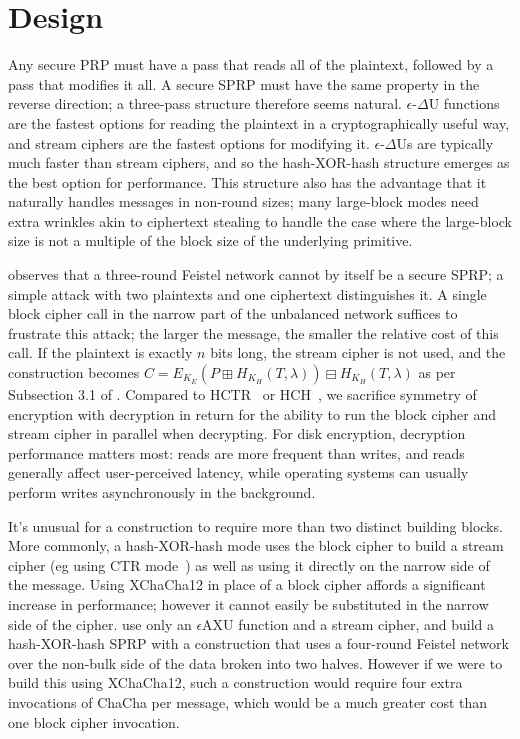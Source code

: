 \documentclass[eprint.tex]{subfiles}
\begin{document}
\section{Design}
Any secure PRP must have a pass that reads all of the plaintext, followed by a pass that modifies
it all. A secure SPRP must have the same property in the reverse direction;
a three-pass structure therefore seems natural.
$\epsilon$-$\Delta$U functions are the fastest options for reading the plaintext in a
cryptographically useful way, and stream ciphers are the fastest options for modifying it.
$\epsilon$-$\Delta$Us
are typically much faster than stream ciphers, and so the hash-XOR-hash structure emerges as
the best option for performance. This structure also has the advantage that it naturally handles
messages in non-round sizes; many large-block modes need extra wrinkles akin to ciphertext stealing
to handle the case where the large-block size is not
a multiple of the block size of the underlying primitive.

\cite{luby-rackoff} observes that a three-round Feistel network cannot by itself be a secure SPRP;
a simple attack with two plaintexts and one ciphertext distinguishes it. A single block cipher call
in the narrow part of the unbalanced network suffices to frustrate this attack; the
larger the message, the smaller the relative cost of this call. If the plaintext is exactly $n$ bits
long, the stream cipher is not used, and the construction becomes
$C = E_{K_E}(P \boxplus H_{K_H}(T, \lambda)) \boxminus H_{K_H}(T, \lambda)$
as per Subsection 3.1 of \cite{tweakable}.
Compared to HCTR~\cite{hctr} or HCH~\cite{hch}, we sacrifice
symmetry of encryption with decryption in return for
the ability to run the block cipher and stream cipher in parallel when decrypting.
For disk encryption, decryption performance matters most:
reads are more frequent than writes, and reads generally affect user-perceived latency, while
operating systems can usually perform writes asynchronously in the background.

It's unusual for a construction to require more than two distinct building blocks.
More commonly, a hash-XOR-hash mode uses the block cipher to build a stream cipher
(eg using CTR mode~\cite{ctr})
as well as using it directly on the narrow side of the message.
Using XChaCha12 in place of a block cipher affords a significant increase in performance;
however it cannot easily be substituted in the narrow side of the cipher.
\cite{sarkar1,sarkar2,sarkar3,sarkar4} use only an $\epsilon$AXU function
and a stream cipher, and build a hash-XOR-hash SPRP
with a construction that uses a four-round Feistel network over the non-bulk side of the data
broken into two halves. However if we were to build this using XChaCha12,
such a construction would require four extra invocations of ChaCha per message, which would be
a much greater cost than one block cipher invocation.
\end{document}
